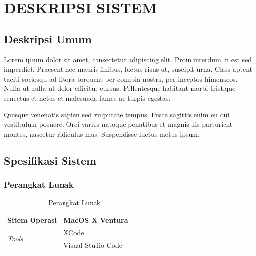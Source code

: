 \chapter{DESKRIPSI SISTEM}

\section{Deskripsi Umum}
Lorem ipsum dolor sit amet, consectetur adipiscing elit. Proin interdum in est sed imperdiet. Praesent nec mauris finibus, luctus risus ut, suscipit urna. Class aptent taciti sociosqu ad litora torquent per conubia nostra, per inceptos himenaeos. Nulla ut nulla ut dolor efficitur cursus. Pellentesque habitant morbi tristique senectus et netus et malesuada fames ac turpis egestas.

Quisque venenatis sapien sed vulputate tempus. Fusce sagittis enim eu dui vestibulum posuere. Orci varius natoque penatibus et magnis dis parturient montes, nascetur ridiculus mus. Suspendisse luctus metus ipsum.

\section{Spesifikasi Sistem}

\subsection{Perangkat Lunak}
\begin{table}[ht!]
    \centering
    \begin{tabular}{|l|l|l|l|}
        \hline
        Sitem Operasi                   & MacOS X Ventura    \\ \hline
        \multirow{2}{*}{\textit{Tools}} & XCode              \\ \cline{2-2}
                                        & Visual Studio Code \\ \hline
    \end{tabular}
    \caption{Perangkat Lunak}
    \label{tab:softwareUsed}
\end{table}

